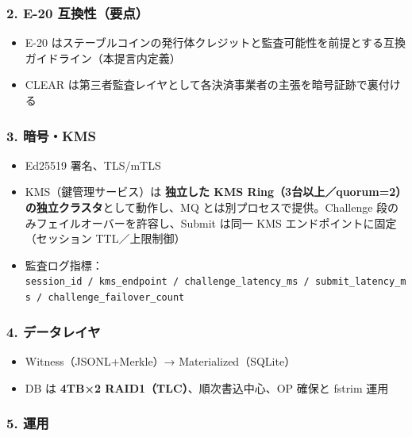 \documentclass[
]{article}
\providecommand{\tightlist}{%
  \setlength{\itemsep}{0pt}\setlength{\parskip}{0pt}}
\begin{document}
\subsubsection{2. E-20
互換性（要点）}\label{e-20-ux4e92ux63dbux6027ux8981ux70b9}

\begin{itemize}
\tightlist
\item
  E-20
  はステーブルコインの発行体クレジットと監査可能性を前提とする互換ガイドライン（本提言内定義）\\
\item
  CLEAR は第三者監査レイヤとして各決済事業者の主張を暗号証跡で裏付ける
\end{itemize}

\subsubsection{3. 暗号・KMS}\label{ux6697ux53f7kms}

\begin{itemize}
\tightlist
\item
  Ed25519 署名、TLS/mTLS\\
\item
  KMS（鍵管理サービス）は \textbf{独立した KMS
  Ring（3台以上／quorum=2）の独立クラスタ}として動作し、MQ
  とは別プロセスで提供。Challenge 段のみフェイルオーバーを許容し、Submit
  は同一 KMS エンドポイントに固定（セッション TTL／上限制御）\\
\item
  監査ログ指標：\texttt{session\_id\ /\ kms\_endpoint\ /\ challenge\_latency\_ms\ /\ submit\_latency\_ms\ /\ challenge\_failover\_count}
\end{itemize}

\subsubsection{4.
データレイヤ}\label{ux30c7ux30fcux30bfux30ecux30a4ux30e4}

\begin{itemize}
\tightlist
\item
  Witness（JSONL+Merkle）→ Materialized（SQLite）\\
\item
  DB は \textbf{4TB×2 RAID1（TLC）}、順次書込中心、OP 確保と fstrim 運用
\end{itemize}

\subsubsection{5. 運用}\label{ux904bux7528}
\end{document}
